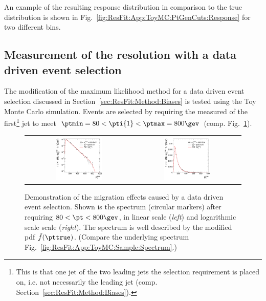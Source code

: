 An example of the resulting response distribution in comparison to the true
distribution is shown in Fig.~\ref{fig:ResFit:App:ToyMC:PtGenCuts:Response} for
two different \pttrue bins.


\subsection{Measurement of the resolution with a data driven event
  selection}\label{sec:ResFit:App:ToyMC:PtCaloCuts}

The modification of the maximum likelihood method for a data driven
event selection discussed in Section~\ref{sec:ResFit:Method:Biases} is
tested using the Toy Monte Carlo simulation.
Events are selected by requiring the measured \pt of the
first\footnote{This is that one jet of the two leading jets the
  selection requirement is placed on, i.e. not necessarily the leading
  jet (comp. Section~\ref{sec:ResFit:Method:Biases}).} jet to
meet \mbox{$\ptmin = 80 < \pti{1} < \ptmax = 800\gev$} (comp. Fig.~\ref{fig:ResFit:App:ToyMC:PtCuts:Spectrum}).

\begin{figure}[ht]
  \centering
  \begin{tabular}{cc}
    \includegraphics[width=0.45\textwidth]{figures/resFit_ToyMC_PtCuts_SpectrumLog} &
    \includegraphics[width=0.45\textwidth]{figures/resFit_ToyMC_PtCuts_SpectrumLinear} \\
  \end{tabular}
  \caption{Demonstration of the migration effects caused by a data
    driven event selection.
    Shown is the \pttrue spectrum (circular markers) after
    requiring \mbox{$80 < \pt < 800\gev$}, in linear scale
    (\textit{left}) and logarithmic scale scale (\textit{right}).
    The spectrum is well described by the modified pdf
    $\tilde{f}(\pttrue)$.
    (Compare the underlying spectrum Fig.~\ref{fig:ResFit:App:ToyMC:Sample:Spectrum}.)
  }
  \label{fig:ResFit:App:ToyMC:PtCuts:Spectrum}
\end{figure}


